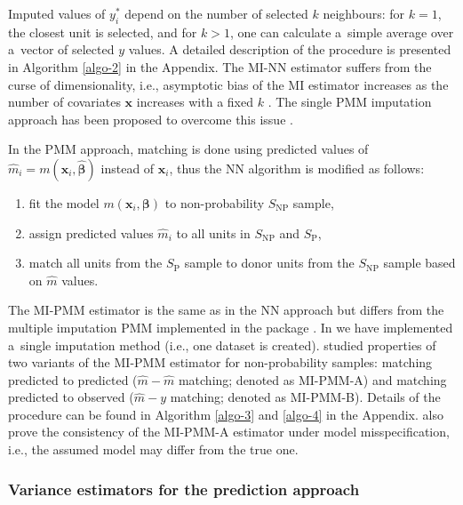 \documentclass[
]{jss}
\begin{document}
Imputed values of \(y_i^*\) depend on the number of selected \(k\)
neighbours: for \(k=1\), the closest unit is selected, and for \(k>1\),
one can calculate a~simple average over a~vector of selected \(y\)
values. A detailed description of the procedure is presented in
Algorithm \ref{algo-2} in the Appendix. The MI-NN estimator suffers from
the curse of dimensionality, i.e., asymptotic bias of the MI estimator
increases as the number of covariates \(\boldsymbol{x}\) increases with
a fixed \(k\) \citep{abadie2006large, yang_asymptotic_2020}. The single
PMM imputation approach has been proposed to overcome this issue
\citep{chlebicki2025}.

In the PMM approach, matching is done using predicted values of
\(\hat{m}_i=m\left(\boldsymbol{x}_i, \hat{\boldsymbol{\beta}}\right)\)
instead of \(\boldsymbol{x}_i\), thus the NN algorithm is modified as
follows:

\begin{enumerate}
\item fit the model $m\left(\boldsymbol{x}_i, \boldsymbol{\beta}\right)$ to non-probability $S_{\text{NP}}$ sample, 
\item assign predicted values $\hat{m}_i$ to all units in $S_{\text{NP}}$ and $S_{\text{P}}$, 
\item match all units from the $S_{\text{P}}$ sample to donor units from the $S_{\text{NP}}$ sample based on $\hat{m}$ values. 
\end{enumerate}

The MI-PMM estimator is the same as in the NN approach but differs from
the multiple imputation PMM implemented in the  package
\citep{mice}. In  we have implemented a~single
imputation method (i.e., one dataset is created). \citet{chlebicki2025}
studied properties of two variants of the MI-PMM estimator for
non-probability samples: matching predicted to predicted
(\(\hat{m}-\hat{m}\) matching; denoted as MI-PMM-A) and matching
predicted to observed (\(\hat{m}-y\) matching; denoted as MI-PMM-B).
Details of the procedure can be found in Algorithm \ref{algo-3} and
\ref{algo-4} in the Appendix. \citet{chlebicki2025} also prove the
consistency of the MI-PMM-A estimator under model misspecification,
i.e., the assumed model may differ from the true one.

\subsubsection{Variance estimators for the prediction
approach}\label{variance-estimators-for-the-prediction-approach}
\end{document}
